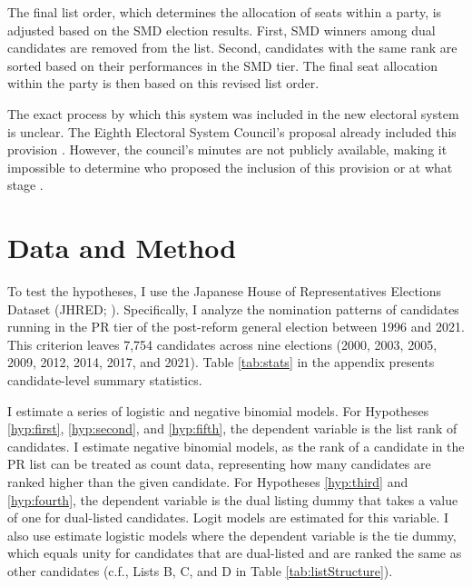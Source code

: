 \documentclass[a4paper, 11pt]{article}
\begin{document}


The final list order, which determines the allocation of seats within a party, is adjusted based on the SMD election results. First, SMD winners among dual candidates are removed from the list. Second, candidates with the same rank are sorted based on their performances in the SMD tier.\footnotemark{} The final seat allocation within the party is then based on this revised list order.


The exact process by which this system was included in the new electoral system is unclear. The Eighth Electoral System Council's proposal already included this provision \citep{yoshidaChusenkyokuseiKaraShosenkyokuhireidaihyou2018}. However, the council's minutes are not publicly available, making it impossible to determine who proposed the inclusion of this provision or at what stage \citep{theasahishimbunSenkyoseidoshinNoGijiroku1991}.

\section{Data and Method} \label{sec: emp}

To test the hypotheses, I use the Japanese House of Representatives Elections Dataset (JHRED; \citet{reedReedSmithJapaneseHouse2017}). Specifically, I analyze the nomination patterns of candidates running in the PR tier of the post-reform general election between 1996 and 2021. This criterion leaves 7,754 candidates across nine elections (2000, 2003, 2005, 2009, 2012, 2014, 2017, and 2021). Table \ref{tab:stats} in the appendix presents candidate-level summary statistics. 

I estimate a series of logistic and negative binomial models. For Hypotheses \ref{hyp:first}, \ref{hyp:second}, and \ref{hyp:fifth}, the dependent variable is the list rank of candidates. I estimate negative binomial models, as the rank of a candidate in the PR list can be treated as count data, representing how many candidates are ranked higher than the given candidate. For Hypotheses \ref{hyp:third} and \ref{hyp:fourth}, the dependent variable is the dual listing dummy that takes a value of one for dual-listed candidates. Logit models are estimated for this variable. I also use estimate logistic models where the dependent variable is the tie dummy, which equals unity for candidates that are dual-listed and are ranked the same as other candidates (c.f., Lists B, C, and D in Table \ref{tab:listStructure}). 
\end{document}
